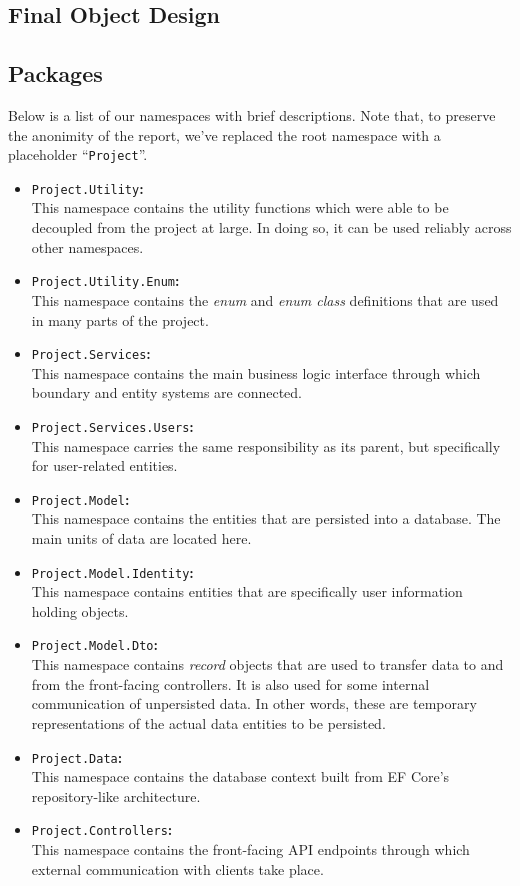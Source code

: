 \documentclass[a4paper, 12pt, titlepage]{article}
\begin{document}
  \subsection{Final Object Design}

  \subsection{Packages}

  Below is a list of our namespaces with brief descriptions.
  Note that, to preserve the anonimity of the report, we've replaced the root namespace with a placeholder ``\texttt{Project}''.

  \begin{itemize}
    \item \texttt{Project.Utility}\textbf{:}\\
      This namespace contains the utility functions which were able to be decoupled from the project at large.
      In doing so, it can be used reliably across other namespaces.
    \item \texttt{Project.Utility.Enum}\textbf{:}\\
      This namespace contains the \textit{enum} and \textit{enum class} definitions that are used in many parts of the project.
    \item \texttt{Project.Services}\textbf{:}\\
      This namespace contains the main business logic interface through which boundary and entity systems are connected.
    \item \texttt{Project.Services.Users}\textbf{:}\\
      This namespace carries the same responsibility as its parent, but specifically for user-related entities.
    \item \texttt{Project.Model}\textbf{:}\\
      This namespace contains the entities that are persisted into a database. The main units of data are located here.
    \item \texttt{Project.Model.Identity}\textbf{:}\\
      This namespace contains entities that are specifically user information holding objects.
    \item \texttt{Project.Model.Dto}\textbf{:}\\
      This namespace contains \textit{record} objects that are used to transfer data to and from the front-facing controllers.
      It is also used for some internal communication of unpersisted data.
      In other words, these are temporary representations of the actual data entities to be persisted.
    \item \texttt{Project.Data}\textbf{:}\\
      This namespace contains the database context built from EF Core's repository-like architecture.
    \item \texttt{Project.Controllers}\textbf{:}\\
      This namespace contains the front-facing API endpoints through which external communication with clients take place.
  \end{itemize}
\end{document}
